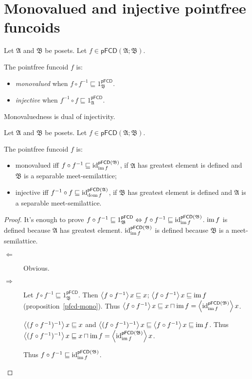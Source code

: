 \section{Monovalued and injective pointfree funcoids}
\begin{defn}
Let $\mathfrak{A}$ and $\mathfrak{B}$ be posets. Let $f\in\mathsf{pFCD}(\mathfrak{A};\mathfrak{B})$.

The pointfree funcoid $f$ is:
\begin{itemize}
\item {}\emph{monovalued} when $f\circ f^{-1}\sqsubseteq1_{\mathfrak{B}}^{\mathsf{pFCD}}$.
\item {}\emph{injective} when $f^{-1}\circ f\sqsubseteq1_{\mathfrak{A}}^{\mathsf{pFCD}}$.
\end{itemize}
\end{defn}
Monovaluedness is dual of injectivity.
\begin{prop}
Let $\mathfrak{A}$ and $\mathfrak{B}$ be posets. Let $f\in\mathsf{pFCD}(\mathfrak{A};\mathfrak{B})$.

The pointfree funcoid $f$ is:
\begin{itemize}
\item monovalued iff $f\circ f^{-1}\sqsubseteq\operatorname{id}_{\operatorname{im} f}^{\mathsf{pFCD}(\mathfrak{B})}$,
if $\mathfrak{A}$ has greatest element is defined and $\mathfrak{B}$ is a separable meet-semilattice;
\item injective iff $f^{-1}\circ f\sqsubseteq\operatorname{id}_{\operatorname{dom} f}^{\mathsf{pFCD}(\mathfrak{A})}$,
if $\mathfrak{B}$ has greatest element is defined and $\mathfrak{A}$ is a separable meet-semilattice. 
\end{itemize}
\end{prop}
\begin{proof}
It's enough to prove $f\circ f^{-1}\sqsubseteq1_{\mathfrak{B}}^{\mathsf{pFCD}}\Leftrightarrow f\circ f^{-1}\sqsubseteq\operatorname{id}_{\operatorname{im} f}^{\mathsf{pFCD}(\mathfrak{B})}$.
$\operatorname{im} f$ is defined because $\mathfrak{A}$ has greatest element. $\operatorname{id}_{\operatorname{im} f}^{\mathsf{pFCD}(\mathfrak{B})}$ is defined because $\mathfrak{B}$ is a meet-semilattice.
\begin{description}
\item [{$\Leftarrow$}] Obvious.
\item [{$\Rightarrow$}] Let $f\circ f^{-1}\sqsubseteq1_{\mathfrak{B}}^{\mathsf{pFCD}}$.
Then $\left\langle f\circ f^{-1}\right\rangle x\sqsubseteq x$; $\left\langle f\circ f^{-1}\right\rangle x\sqsubseteq\operatorname{im} f$ (proposition~\ref{pfcd-mono}).
Thus $\left\langle f\circ f^{-1}\right\rangle x\sqsubseteq x\sqcap\operatorname{im} f=\left\langle \operatorname{id}_{\operatorname{im} f}^{\mathsf{pFCD}(\mathfrak{B})}\right\rangle x$.


$\left\langle (f\circ f^{-1})^{-1}\right\rangle x\sqsubseteq x$ and $\left\langle (f\circ f^{-1})^{-1}\right\rangle x\sqsubseteq\left\langle f\circ f^{-1}\right\rangle x\sqsubseteq\operatorname{im} f$.
Thus $\left\langle (f\circ f^{-1})^{-1}\right\rangle x\sqsubseteq x\sqcap\operatorname{im} f=\left\langle \operatorname{id}_{\operatorname{im} f}^{\mathsf{pFCD}(\mathfrak{B})}\right\rangle x$.


Thus $f\circ f^{-1}\sqsubseteq\operatorname{id}_{\operatorname{im} f}^{\mathsf{pFCD}(\mathfrak{B})}$.

\end{description}
\end{proof}

